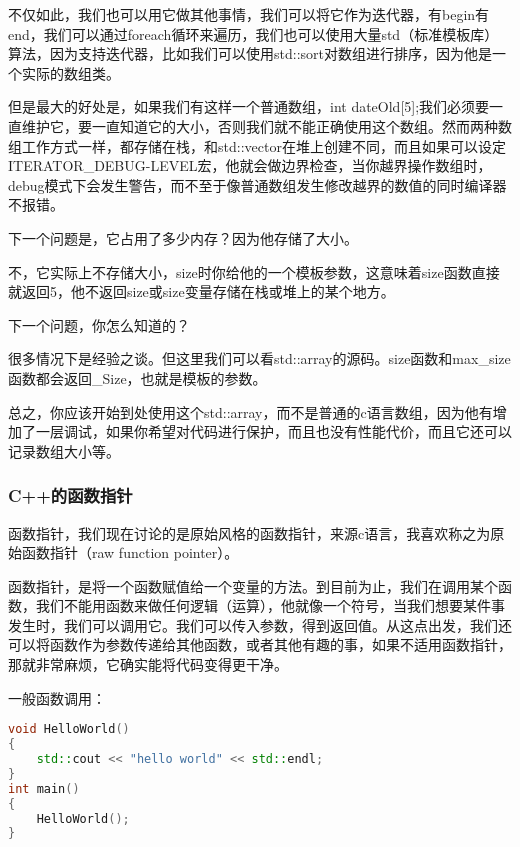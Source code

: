 不仅如此，我们也可以用它做其他事情，我们可以将它作为迭代器，有{\ncodestyle begin}有{\ncodestyle end}，我们可以通过{\ncodestyle foreach}循环来遍历，我们也可以使用大量std（标准模板库）算法，因为支持迭代器，比如我们可以使用{\ncodestyle std::sort}对数组进行排序，因为他是一个实际的数组类。

但是最大的好处是，如果我们有这样一个普通数组，{\ncodestyle int dateOld[5];}我们必须要一直维护它，要一直知道它的大小，否则我们就不能正确使用这个数组。然而两种数组工作方式一样，都存储在栈，和{\ncodestyle std::vector}在堆上创建不同，而且如果可以设定{\ncodestyle ITERATOR_DEBUG-LEVEL}宏，他就会做边界检查，当你越界操作数组时，debug模式下会发生警告，而不至于像普通数组发生修改越界的数值的同时编译器不报错。

下一个问题是，它占用了多少内存？因为他存储了大小。

不，它实际上不存储大小，{\ncodestyle size}时你给他的一个模板参数，这意味着{\ncodestyle size}函数直接就返回5，他不返回{\ncodestyle size}或{\ncodestyle size}变量存储在栈或堆上的某个地方。

下一个问题，你怎么知道的？

很多情况下是经验之谈。但这里我们可以看{\ncodestyle std::array}的源码。{\ncodestyle size}函数和{\ncodestyle max_size}函数都会返回{\ncodestyle _Size}，也就是模板的参数。

总之，你应该开始到处使用这个{\ncodestyle std::array}，而不是普通的c语言数组，因为他有增加了一层调试，如果你希望对代码进行保护，而且也没有性能代价，而且它还可以记录数组大小等。


\subsubsection{C++的函数指针}

函数指针，我们现在讨论的是原始风格的函数指针，来源c语言，我喜欢称之为原始函数指针（raw function pointer）。

函数指针，是将一个函数赋值给一个变量的方法。到目前为止，我们在调用某个函数，我们不能用函数来做任何逻辑（运算），他就像一个符号，当我们想要某件事发生时，我们可以调用它。我们可以传入参数，得到返回值。从这点出发，我们还可以将函数作为参数传递给其他函数，或者其他有趣的事，如果不适用函数指针，那就非常麻烦，它确实能将代码变得更干净。

一般函数调用：

\begin{lstlisting}[language=c++]
void HelloWorld()
{
    std::cout << "hello world" << std::endl;
}
int main()
{
    HelloWorld();
}
\end{lstlisting}

